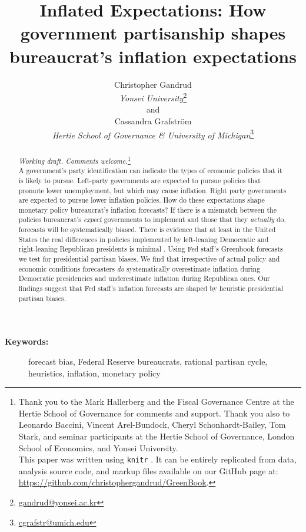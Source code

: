 \documentclass[a4paper]{article}\usepackage{graphicx, color}
\title{Inflated Expectations: How government partisanship shapes bureaucrat's inflation expectations}
\author{Christopher Gandrud \\
                {\emph{Yonsei University}}\footnote{\href{mailto:gandrud@yonsei.ac.kr}{gandrud@yonsei.ac.kr}} \\
                and \\
            Cassandra Grafstr\"{o}m \\
                {\emph{Hertie School of Governance \& University of Michigan}}\footnote{\href{mailto:cgrafstr@umich.edu}{cgrafstr@umich.edu}}}
\begin{document}
\maketitle

\begin{abstract}
\noindent\emph{Working draft. Comments welcome.}\footnote{Thank you to the Mark Hallerberg and the Fiscal Governance Centre at the Hertie School of Governance for comments and support. Thank you also to Leonardo Baccini, Vincent Arel-Bundock, Cheryl Schonhardt-Bailey, Tom Stark, and seminar participants at the Hertie School of Governance, London School of Economics, and Yonsei University. \\
This paper was written using {\tt{knitr}} \citep{knitr2013}. It can be entirely replicated from data, analysis source code, and markup files available on our GitHub page at: {\url{https://github.com/christophergandrud/GreenBook}}.} \\[0.2cm]


A government's party identification can indicate the types of economic policies that it is likely to pursue. Left-party governments are expected to pursue policies that promote lower unemployment, but which may cause inflation. Right party governments are expected to pursue lower inflation policies. How do these expectations shape monetary policy bureaucrat's inflation forecasts? If there is a mismatch between the policies bureaucrat's \emph{expect} governments to implement and those that they \emph{actually} do, forecasts will be systematically biased. There is evidence that at least in the United States the real differences in policies implemented by left-leaning Democratic and right-leaning Republican presidents is minimal \citep{Bartels2008}. Using Fed staff's Greenbook forecasts we test for presidential partisan biases. We find that irrespective of actual policy and economic conditions forecasters \emph{do} systematically overestimate inflation during Democratic presidencies and underestimate inflation during Republican ones. Our findings suggest that Fed staff's inflation forecasts are shaped by heuristic presidential partisan biases.

\end{abstract}

\begin{description}
  \item [{\textbf{Keywords:}}] forecast bias, Federal Reserve bureaucrats, rational partisan cycle, heuristics, inflation, monetary policy
\end{description}
\end{document}
